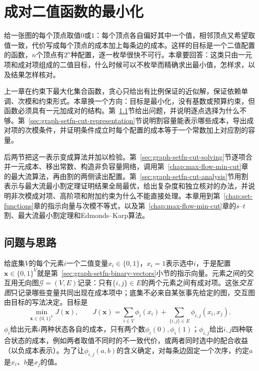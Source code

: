 
\chapter{成对二值函数的最小化}
\label{sec:graph-pairwise-binary-cut}
\label{chap:pairwise-binary-minimization}

给一张图的每个顶点取值$0$或$1$：每个顶点各自偏好其中一个值，相邻顶点又希望取值一致，代价写成每个顶点的成本加上每条边的成本。这样的目标是一个二值配置的函数，$n$个顶点有$2^n$种配置，逐一枚举很快不可行。本章要回答：这类只由一元项和成对项组成的二值目标，什么时候可以不枚举而精确求出最小值，怎样求，以及结果怎样核对。

上一章在约束下最大化集合函数，贪心只给出有比例保证的近似解，保证依赖单调、次模和约束形式。本章换一个方向：目标是最小化，没有基数或预算约束，但函数必须具有一元加成对的结构。第~\ref{sec:graph-setfn-pairwise-problem}节给出问题，并说明逐点选择为什么不够。第~\ref{sec:graph-setfn-cut-representation}节说明割容量能表示哪些成本，导出成对项的次模条件，并证明条件成立时每个配置的成本等于一个常数加上对应割的容量。

后两节把这一表示变成算法并加以检验。第~\ref{sec:graph-setfn-cut-solving}节逐项合并一元成本、移出常数、构造非负容量网络，调用第~\ref{chap:max-flow-min-cut}章的最大流算法，再由割的两侧读出配置。第~\ref{sec:graph-setfn-cut-analysis}节用割表示与最大流最小割定理证明结果全局最优，给出复杂度和独立核对的办法，并说明非次模成对项、高阶项和附加约束为什么不能直接处理。本章用到第~\ref{chap:set-functions}章的指示向量与次模不等式，以及第~\ref{chap:max-flow-min-cut}章的$s$--$t$割、最大流最小割定理和Edmonds--Karp算法。

\section{问题与思路}
\label{sec:graph-setfn-pairwise-problem}

给底集$V$的每个元素$i$一个二值变量$x_i\in\{0,1\}$，$x_i=1$表示选中$i$，于是配置$\bm x\in\{0,1\}^V$就是第~\ref{sec:graph-setfn-binary-vectors}小节的指示向量。元素之间的交互用无向图$\mathcal G=(V,E)$记录：只有$\{i,j\}\in E$的两个元素之间有成对项。这张\emph{交互图}只记录哪些变量共同出现在成本项中；底集不必来自某张事先给定的图，交互图由目标的写法决定。目标是
\begin{equation}
  \min_{\bm x\in\{0,1\}^V}J(\bm x),\qquad
  J(\bm x)=\sum_{i\in V}\phi_i(x_i)+\sum_{\{i,j\}\in E}\phi_{i,j}(x_i,x_j).
  \label{eq:graph-setfn-pairwise-objective}
\end{equation}
$\phi_i$给出元素$i$两种状态各自的成本，只有两个数$\phi_i(0),\phi_i(1)$；$\phi_{i,j}$给出$i,j$四种联合状态的成本，例如两者取值不同时的不一致代价，或两者同时选中的配合收益（以负成本表示）。为了让$\phi_{i,j}(a,b)$的含义确定，对每条边固定一个次序，约定$a$是$x_i$、$b$是$x_j$的值。

